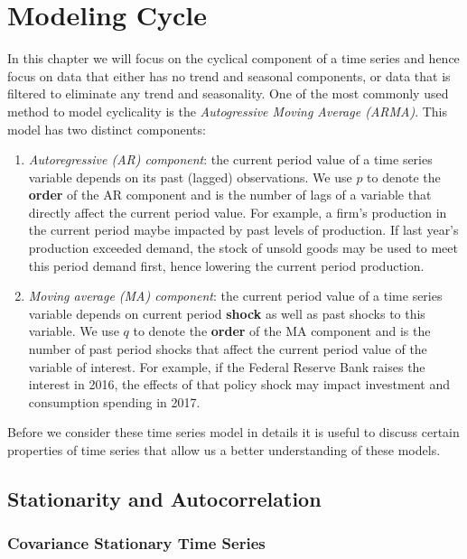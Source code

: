 \documentclass[]{book}
\theoremstyle{definition}
\theoremstyle{definition}
\theoremstyle{definition}
\theoremstyle{remark}
\begin{document}
\hypertarget{modeling-cycle}{%
\chapter{Modeling Cycle}\label{modeling-cycle}}

In this chapter we will focus on the cyclical component of a time series
and hence focus on data that either has no trend and seasonal
components, or data that is filtered to eliminate any trend and
seasonality. One of the most commonly used method to model cyclicality
is the \emph{Autogressive Moving Average (ARMA)}. This model has two
distinct components:

\begin{enumerate}
\def\labelenumi{\arabic{enumi}.}
\item
  \emph{Autoregressive (AR) component}: the current period value of a
  time series variable depends on its past (lagged) observations. We use
  \(p\) to denote the \textbf{order} of the AR component and is the
  number of lags of a variable that directly affect the current period
  value. For example, a firm's production in the current period maybe
  impacted by past levels of production. If last year's production
  exceeded demand, the stock of unsold goods may be used to meet this
  period demand first, hence lowering the current period production.
\item
  \emph{Moving average (MA) component}: the current period value of a
  time series variable depends on current period \textbf{shock} as well
  as past shocks to this variable. We use \(q\) to denote the
  \textbf{order} of the MA component and is the number of past period
  shocks that affect the current period value of the variable of
  interest. For example, if the Federal Reserve Bank raises the interest
  in 2016, the effects of that policy shock may impact investment and
  consumption spending in 2017.
\end{enumerate}

Before we consider these time series model in details it is useful to
discuss certain properties of time series that allow us a better
understanding of these models.

\hypertarget{stationarity-and-autocorrelation}{%
\section{Stationarity and
Autocorrelation}\label{stationarity-and-autocorrelation}}

\hypertarget{covariance-stationary-time-series}{%
\subsection{Covariance Stationary Time
Series}\label{covariance-stationary-time-series}}
\end{document}

